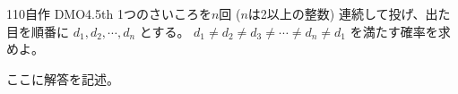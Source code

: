 \begin{prob}{110}{}{自作 DMO4.5th}
 1つのさいころを$n$回 ($n$は2以上の整数) 連続して投げ、出た目を順番に $d_1, d_2, \cdots, d_n$ とする。 $d_1\neq d_2 \neq d_3 \neq \cdots \neq d_n \neq d_1$ を満たす確率を求めよ。
\end{prob}
ここに解答を記述。